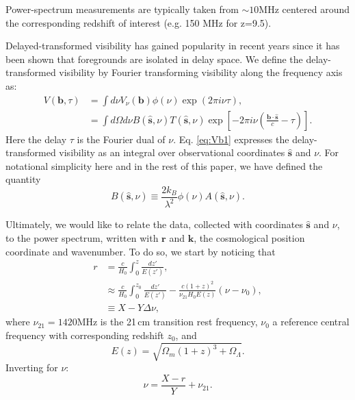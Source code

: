 \documentclass[twocolumn,apj,numberedappendix]{emulateapj}
\renewcommand\[{\begin{equation}}
\renewcommand\]{\end{equation}}
\begin{document}


Power-spectrum measurements are typically taken from $\sim10$MHz centered around the corresponding redshift of interest (e.g. 150 MHz for z=9.5). 

Delayed-transformed visibility has gained popularity in recent years since it has been shown that foregrounds are isolated in delay space. We define the delay-transformed visibility by Fourier transforming visibility along the frequency axis \citep{delay-transform} as:
\small
\begin{equation}
\begin{aligned}V(\boldsymbol{b},\tau) & =\int d\nu V_{\nu}(\boldsymbol{b})\phi(\nu)\exp\left(2\pi i\nu\tau\right),\\
 & =\int d\Omega d\nu B(\hat{\boldsymbol{s}},\nu)T(\hat{\boldsymbol{s}},\nu)\exp\left[-2\pi i\nu\left(\frac{\boldsymbol{b}\cdot\hat{\boldsymbol{s}}}{c}-\tau\right)\right]. 
\end{aligned}
\label{eq:Vb1}
\end{equation}
\normalsize
Here the delay $\tau$ is the Fourier dual of $\nu$. Eq. \eqref{eq:Vb1} expresses the delay-transformed visibility as
an integral over observational coordinates $\hat{\boldsymbol{s}}$ and $\nu$. For notational simplicity here and in the rest of this paper, we have defined the quantity
\[
B(\hat{\boldsymbol{s}},\nu) \equiv \frac{2k_B}{\lambda^2}\phi(\nu)A(\hat{\boldsymbol{s}},\nu). 
\label{eq:B}
\]

Ultimately,
we would like to relate the data, collected with coordinates $\hat{\boldsymbol{s}}$
and $\nu$, to the power spectrum, written with 
$\boldsymbol{r}$ and $\boldsymbol{k}$, the cosmological position coordinate and wavenumber. To do so, we start by noticing that
\[
\begin{aligned}r & =\frac{c}{H_{0}}\int_{0}^{z}\frac{dz'}{E(z')},\\
 & \approx\frac{c}{H_{0}}\int_{0}^{z_{0}}\frac{dz'}{E(z')}-\frac{c(1+z)^{2}}{\nu_{21}H_{0}E(z)}\left(\nu-\nu_{0}\right),\\
 & \equiv X-Y\Delta\nu,
\end{aligned} \label{eq:r}
\]
where $\nu_{21}=1420$MHz is the 21\,cm transition rest frequency, $\nu_{0}$
a reference central frequency with corresponding redshift $z_{0}$,
and 
\[
E(z)=\sqrt{\Omega_{m}(1+z)^{3}+\Omega_{\Lambda}}.
\]
Inverting for $\nu$:
\begin{equation}
\nu=\frac{X-r}{Y}+\nu_{21}.\label{eq:nur}
\end{equation}
\end{document}
